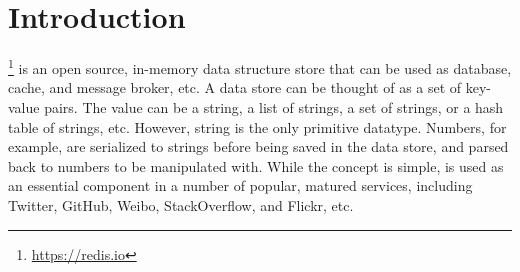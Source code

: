 \newcommand{\framedhslinecorrect}[2]%
  {#1[#2]}

\newcommand{\framedhs}{\sethscode{framedhscode}}


\newenvironment{inlinehscode}%
  {\(\def\column##1##2{}%
   \let\>\undefined\let\<\undefined\let\\\undefined
   \newcommand\>[1][]{}\newcommand\<[1][]{}\newcommand\\[1][]{}%
   \def\fromto##1##2##3{##3}%
   \def\nextline{}}{\) }%

\newcommand{\inlinehs}{\sethscode{inlinehscode}}


\newenvironment{joincode}%
  {\let\orighscode=\hscode
   \let\origendhscode=\endhscode
   \def\endhscode{\def\hscode{\endgroup\def\@currenvir{hscode}\\}\begingroup}
   \orighscode\def\hscode{\endgroup\def\@currenvir{hscode}}}%
  {\origendhscode
   \global\let\hscode=\orighscode
   \global\let\endhscode=\origendhscode}%

\makeatother
\EndFmtInput
%

%
\makeatletter

\let\Varid\mathit
\let\Conid\mathsf

\def\commentbegin{\quad\{\ }
\def\commentend{\}}

\newcommand{\ty}[1]{\Conid{#1}}
\newcommand{\con}[1]{\Conid{#1}}
\newcommand{\id}[1]{\Varid{#1}}
\newcommand{\cl}[1]{\Varid{#1}}
\newcommand{\opsym}[1]{\mathrel{#1}}

\newcommand\Keyword[1]{\textbf{\textsf{#1}}}
\newcommand\Hide{\mathbin{\downarrow}}
\newcommand\Reveal{\mathbin{\uparrow}}




\makeatother
\EndFmtInput

\section{Introduction}
\label{sec:introduction}

\Redis{}\footnote{\url{https://redis.io}} is an open source, in-memory data
structure store that can be used as database, cache, and message broker, etc.
A \Redis{} data store can be thought of as a set of key-value pairs. The value
can be a string, a list of strings, a set of strings, or a hash table of
strings, etc. However, string is the only primitive datatype. Numbers, for
example, are serialized to strings before being saved in the data store, and
parsed back to numbers to be manipulated with. While the concept is simple,
\Redis{} is used as an essential component in a number of popular, matured services, including Twitter, GitHub, Weibo, StackOverflow, and Flickr, etc.

